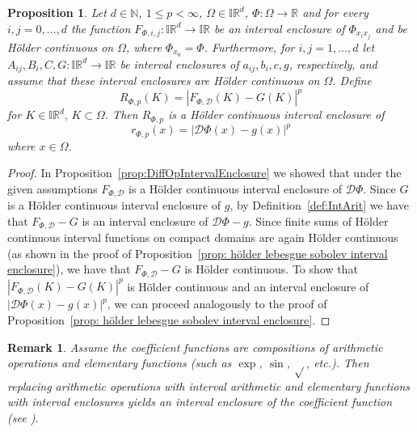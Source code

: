 \documentclass[a4paper, 11pt]{article}
\newtheorem{proposition}[theorem]{Proposition}
\newtheorem{remark}[theorem]{Remark}
\begin{document}
	\begin{proposition}\label{prop: hölder energy}
		Let $d \in \mathbb{N}$, $1\leq p < \infty$, $\Omega \in \mathbb{IR}^d$, $\Phi: \Omega \to \mathbb{R}$ and for every $i,j=0,\dotsc,d$ the function $F_{\Phi, i,j} : \mathbb{IR}^d \to \mathbb{IR}$ be an interval enclosure of $\Phi_{x_ix_j}$ and be Hölder continuous on $\Omega$, where $\Phi_{x_0}=\Phi$. Furthermore, for $i,j=1,\dotsc, d$ let $A_{ij},B_i,C,G: \mathbb{IR}^d \to \mathbb{IR}$ be interval enclosures of $a_{ij},b_i,c,g$, respectively, and assume that these interval enclosures are Hölder continuous on $\Omega$. Define
		\begin{equation}
			R_{\Phi,p}(K) = | F_{\Phi,\mathcal{D}}(K) - G(K)|^p
		\end{equation}
		for $K \in \mathbb{IR}^d, \, K \subset \Omega$. Then $R_{\Phi, p}$ is a Hölder continuous interval enclosure of
		$$ r_{\Phi,p}(x) = |\mathcal{D}\Phi(x) - g(x)|^p $$
		where $x \in \Omega$.
	\end{proposition}
	\begin{proof}
		In Proposition~\ref{prop:DiffOpIntervalEnclosure} we showed that under the given assumptions $F_{\Phi,\mathcal{D}}$ is a Hölder continuous interval enclosure of $\mathcal{D}\Phi$. Since $G$ is a Hölder continuous interval enclosure of $g$, by Definition~\ref{def:IntArit} we have that $F_{\Phi,\mathcal{D}} - G$ is an interval enclosure of $\mathcal{D}\Phi - g$. Since finite sums of Hölder continuous interval functions on compact domains are again Hölder continuous (as shown in the proof of Proposition~\ref{prop: hölder lebesgue sobolev interval enclosure}), we have that $F_{\Phi,\mathcal{D}} - G$ is Hölder continuous. To show that $ | F_{\Phi,\mathcal{D}}(K) - G(K)|^p$ is Hölder continuous and an interval enclosure of $|\mathcal{D}\Phi(x) - g(x)|^p$, we can proceed analogously to the proof of Proposition~\ref{prop: hölder lebesgue sobolev interval enclosure}.
	\end{proof}
	
	\begin{remark}
		Assume the coefficient functions are compositions of arithmetic operations and elementary functions (such as $\exp$, $\sin$, $\sqrt{}$, etc.). Then replacing arithmetic operations with interval arithmetic and elementary functions with interval enclosures yields an interval enclosure of the coefficient function (see \cite{moore2009introduction}).
	\end{remark}
	
	
	
\end{document}
